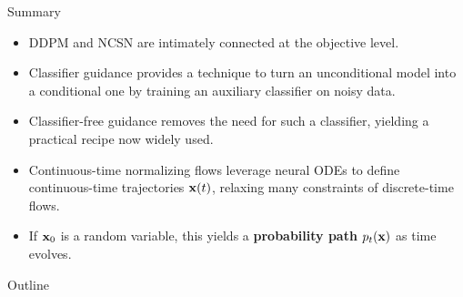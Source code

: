 \documentclass{beamer}
\begin{document}
\begin{frame}{Summary}
	\begin{itemize}
		\item DDPM and NCSN are intimately connected at the objective level.	
		\vfill
		\item Classifier guidance provides a technique to turn an unconditional model into a conditional one by training an auxiliary classifier on noisy data.
		\vfill
		\item Classifier-free guidance removes the need for such a classifier, yielding a practical recipe now widely used.
		\vfill 
		\item Continuous-time normalizing flows leverage neural ODEs to define continuous-time trajectories $\mathbf{x}(t)$, relaxing many constraints of discrete-time flows.
		\vfill
		\item If $\mathbf{x}_0$ is a random variable, this yields a \textbf{probability path} $p_t(\mathbf{x})$ as time evolves.
	\end{itemize}
\end{frame}


\begin{frame}
\titlepage
	\resetonslide	
\end{frame}







\begin{frame}{Outline}
	\tableofcontents
\end{frame}
\end{document}
